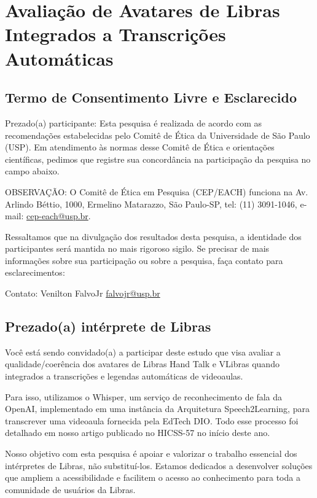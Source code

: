 \section{Avaliação de Avatares de Libras Integrados a Transcrições Automáticas}

\subsection{Termo de Consentimento Livre e Esclarecido}

Prezado(a) participante: Esta pesquisa é realizada de acordo com as recomendações 
estabelecidas pelo Comitê de Ética da Universidade de São Paulo (USP). Em atendimento às 
normas desse Comitê de Ética e orientações científicas, pedimos que registre sua 
concordância na participação da pesquisa no campo abaixo.

OBSERVAÇÃO: O Comitê de Ética em Pesquisa (CEP/EACH) funciona na Av. Arlindo Béttio, 
1000, Ermelino Matarazzo, São Paulo-SP, tel: (11) 3091-1046, e-mail: \href{mailto:cep-each@usp.br}{cep-each@usp.br}.

Ressaltamos que na divulgação dos resultados desta pesquisa, a identidade dos participantes 
será mantida no mais rigoroso sigilo. Se precisar de mais informações sobre sua participação 
ou sobre a pesquisa, faça contato para esclarecimentos: 

Contato: Venilton FalvoJr \href{mailto:falvojr@usp.br}{falvojr@usp.br}

\subsection{Prezado(a) intérprete de Libras}

Você está sendo convidado(a) a participar deste estudo que visa avaliar a 
qualidade/coerência dos avatares de Libras Hand Talk e VLibras quando integrados a 
transcrições e legendas automáticas de videoaulas.

Para isso, utilizamos o Whisper, um serviço de reconhecimento de fala da OpenAI, 
implementado em uma instância da Arquitetura Speech2Learning, para transcrever uma 
videoaula fornecida pela EdTech DIO. Todo esse processo foi detalhado em nosso artigo 
publicado no HICSS-57 no início deste ano.

Nosso objetivo com esta pesquisa é apoiar e valorizar o trabalho essencial dos 
intérpretes de Libras, não substituí-los. Estamos dedicados a desenvolver soluções que 
ampliem a acessibilidade e facilitem o acesso ao conhecimento para toda a comunidade 
de usuários da Libras.

